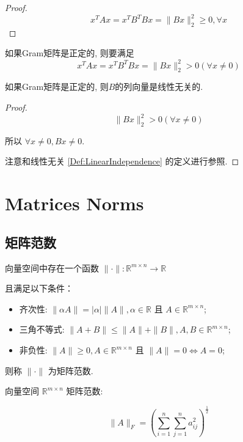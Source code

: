 \begin{proof}
    $$ x^{T} A x=x^{T} B^{T} B x=\|B x\|_{2}^{2} \geq 0 , \forall x $$
\end{proof}

\begin{theorem}
    如果Gram矩阵是正定的, 则要满足
    $$ x^{T} A x=x^{T} B^{T} B x=\|B x\|_{2}^{2}>0 ( \forall x \neq 0) $$
\end{theorem}

\begin{corollary}
    如果Gram矩阵是正定的, 则$B$的列向量是线性无关的.
\end{corollary}

\begin{proof}
    $$\|B x\|_{2}^{2}>0 ( \forall x \neq 0)$$

所以 $\forall x \neq 0, Bx \neq 0  $.

    注意和线性无关 \ref{Def:LinearIndependence} 的定义进行参照.
\end{proof}

\chapter{Matrices Norms}

\section{矩阵范数}

\begin{definition}
    向量空间中存在一个函数 $ \|\cdot\|: \mathbb{R}^{m \times n} \rightarrow \mathbb{R} $

    且满足以下条件：

    \begin{itemize}
        \item 齐次性: $ \|\alpha A\|=|\alpha|\|A\|, \alpha \in \mathbb{R} $ 且 $ A \in \mathbb{R}^{m \times n} $;
        \item 三角不等式: $ \|A+B\| \leq\|A\|+\|B\|, A, B \in \mathbb{R}^{m \times n} $;
        \item 非负性: $ \|A\| \geq 0, A \in \mathbb{R}^{m \times n} $ 且 $ \|A\|=0 \Leftrightarrow A=0 $;
    \end{itemize}

则称 $ \|\cdot\| $ 为矩阵范数. 
\end{definition}

向量空间 $ \mathbb{R}^{m \times n} $ 矩阵范数:

\begin{example}
    $$ \|A\|_{F}=\left(\sum_{i=1}^{n} \sum_{j=1}^{n} a_{i j}^{2}\right)^{\frac{1}{2}} $$
\end{example}

